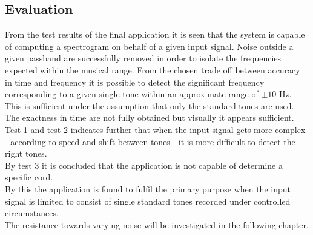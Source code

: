 \subsection{Evaluation}
From the test results of the final application it is seen that the system is capable of computing a spectrogram on behalf of a given input signal. Noise outside a given passband are successfully removed in order to isolate the frequencies expected within the musical range. From the chosen trade off between accuracy in time and frequency   it is possible to detect the significant frequency corresponding to a given single tone within an approximate range of $\pm 10$ Hz. This is sufficient under the assumption that only the standard tones are used. The exactness in time are not fully obtained but visually it appears sufficient.\\        
Test 1 and test 2 indicates further that when the input signal gets more complex - according to speed and shift between tones - it is more difficult to detect the right tones. \\
By test 3 it is concluded that the application is not capable of determine a specific cord.\\   
By this the application is found to fulfil the primary purpose when the input signal is limited to consist of single standard tones recorded under controlled circumstances.\\
The resistance towards varying noise will be investigated in the following chapter.           
